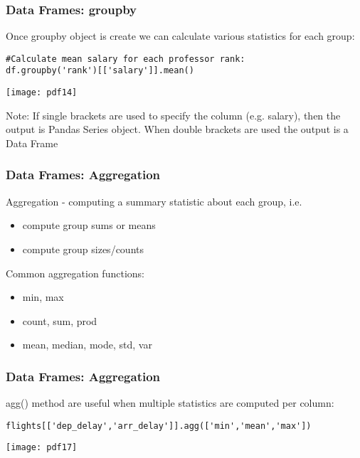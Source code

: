 \begin{frame}[fragile]
\frametitle{Data Frames: groupby}
Once groupby object is create we can calculate various statistics for each group:
\begin{lstlisting}
#Calculate mean salary for each professor rank:
df.groupby('rank')[['salary']].mean()
\end{lstlisting}

\begin{center}
\texttt{[image: pdf14]}
\end{center}
Note: If single brackets are used to specify the column (e.g. salary), then the output is Pandas Series object. When double brackets are used the output is a Data Frame

\end{frame}

\begin{frame}[fragile]
\frametitle{Data Frames: Aggregation}

Aggregation - computing a summary statistic about each group, i.e.
\begin{itemize}
\item compute group sums or means
\item compute group sizes/counts
\end{itemize}

Common aggregation functions:

\begin{itemize}
\item min, max
\item count, sum, prod
\item mean, median, mode, std, var
\end{itemize}

\end{frame}

\begin{frame}[fragile]
\frametitle{Data Frames: Aggregation}
agg() method are useful when multiple statistics are computed per column:
\begin{lstlisting}
flights[['dep_delay','arr_delay']].agg(['min','mean','max'])
\end{lstlisting}

\begin{center}
\texttt{[image: pdf17]}
\end{center}
\end{frame}

